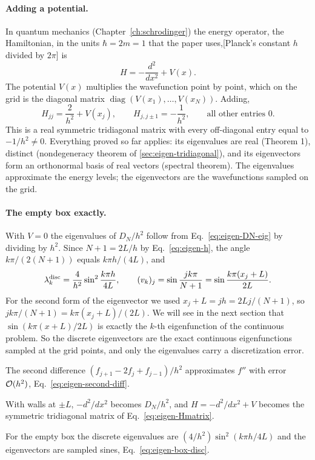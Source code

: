 \paragraph{Adding a potential.} In quantum mechanics (Chapter~\ref{ch:schrodinger}) the energy operator, the Hamiltonian, in the units $\hbar=2m=1$ that the paper uses,[Planck's constant $h$ divided by $2\pi$] is
\begin{equation}
H=-\frac{d^2}{dx^2}+V(x).
\end{equation}
The potential $V(x)$ multiplies the wavefunction point by point, which on the grid is the diagonal matrix $\operatorname{diag}(V(x_1),\dots,V(x_N))$. Adding,
\begin{equation}
\boxed{H_{jj}=\frac{2}{h^2}+V(x_j),\qquad H_{j,j\pm1}=-\frac{1}{h^2},\qquad\text{all other entries }0.}
\label{eq:eigen-Hmatrix}
\end{equation}
This is a real symmetric tridiagonal matrix with every off-diagonal entry equal to $-1/h^2\ne0$. Everything proved so far applies: its eigenvalues are real (Theorem 1), distinct (nondegeneracy theorem of \cref{sec:eigen-tridiagonal}), and its eigenvectors form an orthonormal basis of real vectors (spectral theorem). The eigenvalues approximate the energy levels; the eigenvectors are the wavefunctions sampled on the grid.

\paragraph{The empty box exactly.} With $V=0$ the eigenvalues of $D_N/h^2$ follow from Eq.~\eqref{eq:eigen-DN-eig} by dividing by $h^2$. Since $N+1=2L/h$ by Eq.~\eqref{eq:eigen-h}, the angle $k\pi/(2(N+1))$ equals $k\pi h/(4L)$, and
\begin{equation}
\lambda_k^{\rm disc}=\frac{4}{h^2}\sin^2\frac{k\pi h}{4L},\qquad
(v_k)_j=\sin\frac{jk\pi}{N+1}=\sin\frac{k\pi(x_j+L)}{2L}.
\label{eq:eigen-box-disc}
\end{equation}
For the second form of the eigenvector we used $x_j+L=jh=2Lj/(N+1)$, so $jk\pi/(N+1)=k\pi(x_j+L)/(2L)$. We will see in the next section that $\sin(k\pi(x+L)/2L)$ is exactly the $k$-th eigenfunction of the continuous problem. So the discrete eigenvectors are the exact continuous eigenfunctions sampled at the grid points, and only the eigenvalues carry a discretization error.

\begin{keyideas}
\item The second difference $(f_{j+1}-2f_j+f_{j-1})/h^2$ approximates $f''$ with error $\mathcal{O}(h^2)$, Eq.~\eqref{eq:eigen-second-diff}.
\item With walls at $\pm L$, $-d^2/dx^2$ becomes $D_N/h^2$, and $H=-d^2/dx^2+V$ becomes the symmetric tridiagonal matrix of Eq.~\eqref{eq:eigen-Hmatrix}.
\item For the empty box the discrete eigenvalues are $(4/h^2)\sin^2(k\pi h/4L)$ and the eigenvectors are sampled sines, Eq.~\eqref{eq:eigen-box-disc}.
\end{keyideas}

